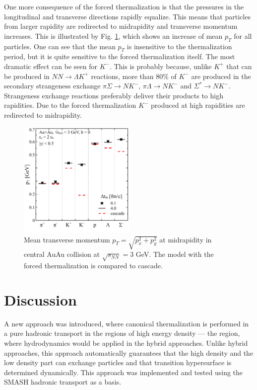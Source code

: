 One more consequence of the forced thermalization is that the pressures in the
longitudinal and transverse directions rapidly equalize. This means that
particles from larger rapidity are redirected to midrapidity and transverse
momentum increases. This is illustrated by Fig. \ref{Fig:AuAu_mean_pt}, which
shows an increase of mean $p_T$ for all particles. One can see that the mean
$p_T$ is insensitive to the thermalization period, but it is quite sensitive to
the forced thermalization itself. The most dramatic effect can be seen for
$K^-$. This is probably because, unlike $K^+$ that can be produced in $NN
\to \Lambda K^+$ reactions, more than 80\% of $K^-$ are produced in the
secondary strangeness exchange $\pi\Sigma\to N K^-$, $\pi\Lambda\to N K^-$ and
$\Sigma^* \to N K^-$. Strangeness exchange reactions preferably deliver their
products to high rapidities. Due to the forced thermalization $K^-$ produced at
high rapidities are redirected to midrapidity.

\begin{figure}
  \centering
  \includegraphics[width=0.5\textwidth]{plots/forced_thermalization/mean_pt.pdf}
  \caption{Mean transverse momentum $p_T = \sqrt{p_x^2 + p_y^2}$ at midrapidity
           in central AuAu collision at $\sqrt{s_{NN}} = 3$ GeV. The model with the forced
           thermalization is compared to cascade.}
  \label{Fig:AuAu_mean_pt}
\end{figure}

\section{Discussion}

A new approach was introduced, where canonical thermalization is performed in a pure
hadronic transport in the regions of high energy density --- the
region, where hydrodynamics would be applied in the hybrid approaches. Unlike
hybrid approaches, this approach automatically guarantees that the high density
and the low density part can exchange particles and that transition
hypersurface is determined dynamically. This approach was implemented and tested
using the SMASH hadronic transport as a basis.

